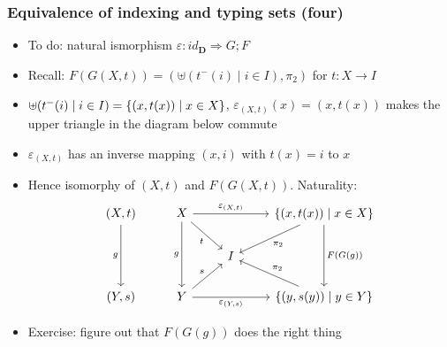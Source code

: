 \documentclass[handout]{beamer}
\newcommand{\To}{\Rightarrow}
\newcommand{\bfsf}[1]{{\boldsymbol{#1}}}
\newcommand{\DD}{\bfsf{D}}
\begin{document}
\frame
  {   
    \frametitle{Equivalence of indexing and typing sets (four)}\label{Ch3:Eq-ind-typ-Set-eps}

 \begin{itemize}[<+->]
\item To do: natural ismorphism $\varepsilon :  id_\DD \To G;F$
\item Recall: $F(G(X,t)) = (\uplus(t^-(i) \mid i\in I),\pi_2)$ for $t:X\to I$
\item  $\uplus(t^-(i) \mid i\in I) = \{(x,t(x))\mid x\in X\}$,
$\varepsilon_{(X,t)}(x) = (x,t(x))$ makes the upper triangle in the diagram below commute
\item $\varepsilon_{(X,t)}$ has an inverse mapping $(x,i)$ with $t(x)=i$ to $x$
\item Hence isomorphy of $(X,t)$ and $F(G(X,t))$.  Naturality:
\[
\begin{tikzcd}[ampersand replacement=\&]
(X,t) \arrow[swap]{dd}{g} \& X  \arrow[swap]{dd}{g}\arrow[swap]{dr}{t}\arrow{rr}{\varepsilon_{(X,t)}} 
\&\&\arrow{dd}{F(G(g))}  \set{(x,t(x))\mid x\in X}\arrow{dl}{\pi_2} \\
\&\&I\\
(Y,s) \& Y  \arrow[swap]{rr}{\varepsilon_{(Y,s)}}\arrow{ur}{s} 
\&\&  \set{(y,s(y))\mid y\in Y} \arrow[swap]{ul}{\pi_2}
\end{tikzcd}
\]
\item Exercise: figure out that $F(G(g))$ does the right thing
 \end{itemize}

 }
\end{document}
